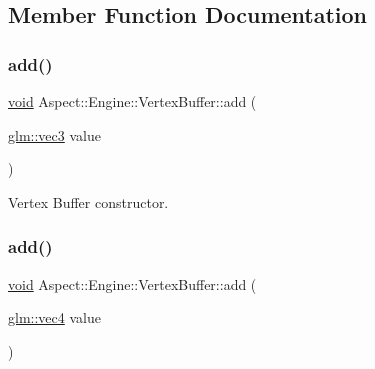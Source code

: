 \subsection{Member Function Documentation}
\mbox{\label{class_aspect_1_1_engine_1_1_vertex_buffer_a4fb009bcbc95ee2db02630dd4b4b5540}} 
\subsubsection{\texorpdfstring{add()}{add()}\hspace{0.1cm}{\footnotesize\ttfamily [1/3]}}
{\footnotesize\ttfamily \mbox{\hyperlink{_s_d_l__opengles2__gl2ext_8h_ae5d8fa23ad07c48bb609509eae494c95}{void}} Aspect\+::\+Engine\+::\+Vertex\+Buffer\+::add (\begin{DoxyParamCaption}\item[{\mbox{\hyperlink{group__core__types_ga1c47e8b3386109bc992b6c48e91b0be7}{glm\+::vec3}}}]{value }\end{DoxyParamCaption})}



Vertex Buffer constructor. 

\mbox{\label{class_aspect_1_1_engine_1_1_vertex_buffer_a8aaf8b66be2c477e198db444462bf6be}} 
\subsubsection{\texorpdfstring{add()}{add()}\hspace{0.1cm}{\footnotesize\ttfamily [2/3]}}
{\footnotesize\ttfamily \mbox{\hyperlink{_s_d_l__opengles2__gl2ext_8h_ae5d8fa23ad07c48bb609509eae494c95}{void}} Aspect\+::\+Engine\+::\+Vertex\+Buffer\+::add (\begin{DoxyParamCaption}\item[{\mbox{\hyperlink{group__core__types_ga5881b1b022d7fd1b7218f5916532dd02}{glm\+::vec4}}}]{value }\end{DoxyParamCaption})}



